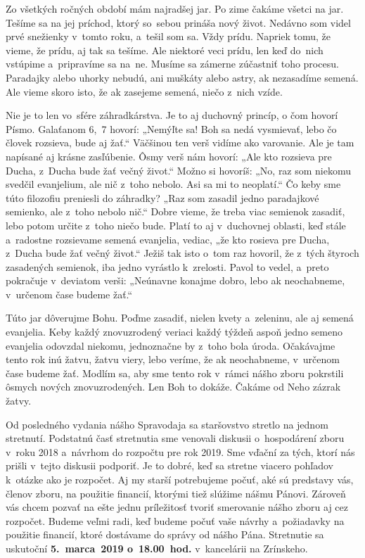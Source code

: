 


Zo všetkých ročných období mám najradšej jar. Po zime čakáme všetci na jar. Tešíme sa na jej príchod, ktorý so~sebou prináša nový život.  Nedávno som videl prvé snežienky v~tomto roku, a~tešil som sa. Vždy prídu. Napriek tomu, že vieme, že prídu, aj tak sa tešíme. Ale niektoré veci prídu, len keď do~nich vstúpime a~pripravíme sa na~ne. Musíme sa zámerne zúčastniť toho procesu. Paradajky alebo uhorky nebudú, ani muškáty alebo astry, ak nezasadíme semená. Ale vieme skoro isto, že ak zasejeme semená, niečo z~nich vzíde.

Nie je to len vo~sfére záhradkárstva. Je to aj duchovný princíp, o čom hovorí Písmo. Galaťanom 6,~7 hovorí: „Nemýľte sa! Boh sa nedá vysmievať, lebo čo človek rozsieva, bude aj žať.“ Väčšinou ten verš vidíme ako varovanie. Ale je tam napísané aj krásne zasľúbenie. Ôsmy verš nám hovorí: „Ale kto rozsieva pre Ducha, z~Ducha bude žať večný život.“ Možno si hovoríš: „No, raz som niekomu svedčil evanjelium, ale nič z~toho nebolo. Asi sa mi to neoplatí.“ Čo keby sme túto filozofiu preniesli do záhradky? „Raz som zasadil jedno paradajkové semienko, ale z~toho nebolo nič.“ Dobre vieme, že treba viac semienok zasadiť, lebo potom určite z~toho niečo bude. Platí to aj v~duchovnej oblasti, keď stále a~radostne rozsievame semená evanjelia, vediac, „že kto rosieva pre Ducha, z~Ducha bude žať večný život.“ Ježiš tak isto o~tom raz hovoril, že z~tých štyroch zasadených semienok, iba jedno vyrástlo k~zrelosti. Pavol to vedel, a~preto pokračuje v~deviatom verši: „Neúnavne konajme dobro, lebo ak neochabneme, v~určenom čase budeme žať.“

Túto jar dôverujme Bohu. Poďme zasadiť, nielen kvety a~zeleninu, ale aj semená evanjelia. Keby každý znovuzrodený veriaci každý týždeň aspoň jedno semeno evanjelia odovzdal niekomu, jednoznačne by z~toho bola úroda. Očakávajme tento rok inú žatvu, žatvu viery, lebo veríme, že ak neochabneme, v~určenom čase budeme žať. Modlím sa, aby sme tento rok v~rámci nášho zboru pokrstili ôsmych nových znovuzrodených. Len Boh to dokáže. Čakáme od Neho zázrak žatvy.



Od posledného vydania nášho Spravodaja sa staršovstvo stretlo na jednom stretnutí. Podstatnú časť stretnutia sme venovali diskusii o~hospodárení zboru v~roku 2018 a~návrhom do rozpočtu pre rok 2019. Sme vďační za tých, ktorí nás prišli v~tejto diskusii podporiť. Je to dobré, keď sa stretne viacero pohľadov k~otázke ako je rozpočet. Aj my starší potrebujeme počuť, aké sú predstavy vás, členov zboru, na použitie financií, ktorými tiež slúžime nášmu Pánovi. Zároveň vás chcem pozvať na ešte jednu príležitosť tvoriť smerovanie nášho zboru aj cez rozpočet. Budeme veľmi radi, keď budeme počuť vaše návrhy a~požiadavky na použitie financií, ktoré dostávame do správy od nášho Pána.  Stretnutie sa uskutoční  {\bf 5.~marca~2019 o~18.00~hod.} v~kancelárii na Zrínskeho.

